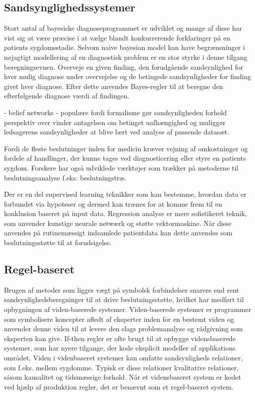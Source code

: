 \subsection{Sandsynglighedssystemer}
Stort antal af bayesiske diagnoseprogrammet er udviklet og mange af disse har vist sig at være præcise i at vælge blandt konkurrerende forklaringer på en patients sygdomsstadie. Selvom naive bayesian model kan have begrænsninger i nøjagtigt modellering af en diagnostisk problem er en stor styrke i denne tilgang beregningsevnen. Overveje en given finding, den forudgående sandsynlighed for hver mulig diagnose under overvejelse og de betingede sandsynligheder for finding givet hver diagnose. Efter dette anvendes Bayes-regler til at beregne den efterfølgende diagnose værdi af findingen. 

- belief networks - populære fordi formalisme gør sandsynligheden forhold perspektiv over vinder antagelsen om betinget uafhængighed og muliggør ledsagerens sandsynligheder at blive lært ved analyse af passende datasæt. 

Fordi de fleste beslutninger inden for medicin kræver vejning af omkostninger og fordele af handlinger, der kunne tages ved diagnosticering eller styre en patients sygdom. Forskere har også udviklede værktøjer som trækker på metoderne til beslutningsanalyse f.eks. beslutningstræ.  

Der er en del supervised learning teknikker som kan bestemme, hvordan data er forbundet via hypoteser og dermed kan trænes for at komme frem til en konklusion  baseret på input data. Regression analyse er mere sofistikeret teknik, som anvender kunstige neurale netwærk og støtte vektormaskine. Når disse anvendes på rutinemæssigt indsamlede patientdata kan dette anvendes som beslutningsstøtte til at forudsigelse.

\subsection{Regel-baseret}
Brugen af metoder som ligger vægt på symbolsk forbindelser snarere end rent sandsynlighedsberegninger til at drive beslutningsstøtte, hvilket har medført til opbygningen af viden-baserede systemer. Viden-baserede systemer er programmer som symbolisere koncepter afledt af eksperter inden for en bestemt viden og anvender denne viden til at levere den slags problemanalyse og rådgivning som eksperten kan give. If-then regler er ofte brugt til at opbygge vidensbaserede systemer, som har nyere tilgange, der kode eksplicit modeller af applikations området. Viden i videnbaseret systemer kan omfatte sandsynligheds relationer, som f.eks. mellem sygdomme. Typisk er disse relationer kvalitative relationer, såsom kausalitet og tidsmæssige forhold. Når et vidensbaseret system er kodet ved hjælp af produktion regler, det er benævnt som et regel-baseret system.

